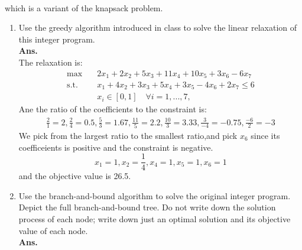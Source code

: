 \documentclass[12pt]{article}
\begin{document}
\begin{enumerate}
\begin{align*}
            \end{align*}
            which is a variant of the knapsack problem.
            \begin{enumerate}
                  \item Use the greedy algorithm introduced in class to solve the linear relaxation of this integer program.\\
                        \textbf{Ans.}\\
                        The relaxation is:
                        \begin{align*}
                              \max \quad       & 2x_1 + 2x_2 + 5x_3 + 11x_4 + 10x_5+3x_6 -6x_7       \\
                              \text{s.t.}\quad & x_1 + 4x_2 + 3x_3 + 5x_4 + 3x_5 -4x_6 + 2x_7 \leq 6 \\
                                               & x_i \in [0,1] \quad \forall i = 1,...,7,
                        \end{align*}
                        Ane the ratio of the coefficients to the constraint is:
                        \begin{equation*}
                              \begin{aligned}
                                    \frac{2}{1} = 2, \frac{2}{4} = 0.5, \frac{5}{3} = 1.67, \frac{11}{5} = 2.2, \frac{10}{3} = 3.33, \frac{3}{-4} = -0.75, \frac{-6}{2} = -3
                              \end{aligned}
                        \end{equation*}
                        We pick from the largest ratio to the smallest ratio,and pick $x_6$ since its coefficeients is positive and the constraint is negative.
                        \begin{equation*}
                              x_1 = 1,x_2 = \frac{1}{4},x_4=1,x_5 = 1,x_6 = 1
                        \end{equation*}
                        and the objective value is 26.5.
                  \item Use the branch-and-bound algorithm to solve the original integer program. Depict the full branch-and-bound tree. Do not write down the solution process of each node; write down just an optimal solution and its objective value of each node.\\
                        \textbf{Ans.}\\
                        \begin{tikzpicture}[
                                    node distance=1.5cm,
                                    node/.style={rectangle, draw, align=center},
                              ]


\end{tikzpicture}
\end{enumerate}
\end{enumerate}
\end{document}
